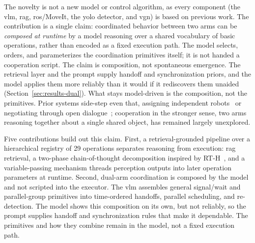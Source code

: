 \documentclass[
     12pt,
     a4paper,
     BCOR=10mm,
     DIV=14,
     listof=totoc,
     bibliography=totoc,
     parskip,
     twoside,
     headsepline
     ]{scrreprt}
\begin{document}
The novelty is not a new model or control algorithm, as every component (the \gls{vlm}, \gls{rag}, \gls{ros}/MoveIt, the \gls{yolo} detector, and \gls{vgn}) is based on previous work. The contribution is a single claim: coordinated behavior between two arms can be \emph{composed at runtime} by a model reasoning over a shared vocabulary of basic operations, rather than encoded as a fixed execution path. The model selects, orders, and parameterizes the coordination primitives itself; it is not handed a cooperation script. The claim is composition, not spontaneous emergence. The retrieval layer and the prompt supply handoff and synchronization priors, and the model applies them more reliably than it would if it rediscovers them unaided (Section~\ref{sec:results-dual}). What stays model-driven is the composition, not the primitives. Prior systems side-step even that, assigning independent robots~\cite{ahn2024autortembodiedfoundationmodels} or negotiating through open dialogue~\cite{mandi2023rocodialecticmultirobotcollaboration}; cooperation in the stronger sense, two arms reasoning together about a single shared object, has remained largely unexplored.

Five contributions build out this claim. First, a retrieval-grounded pipeline over a hierarchical registry of 29 operations separates reasoning from execution: \gls{rag} retrieval, a two-phase chain-of-thought decomposition inspired by RT-H~\cite{belkhale2024rthactionhierarchiesusing}, and a variable-passing mechanism threads perception outputs into later operation parameters at runtime. Second, dual-arm coordination is composed by the model and not scripted into the executor. The \gls{vlm} assembles general signal/wait and parallel-group primitives into time-ordered handoffs, parallel scheduling, and re-detection. The model shows this composition on its own, but not reliably, so the prompt supplies handoff and synchronization rules that make it dependable. The primitives and how they combine remain in the model, not a fixed execution path.
\end{document}
